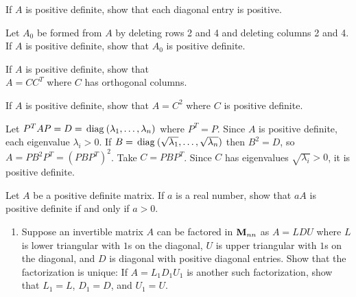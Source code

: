 \begin{multicols}{2}
\begin{ex}
If $A$ is positive definite, show that each diagonal entry is positive.
\end{ex}

\begin{ex}
Let $A_{0}$ be formed from $A$ by deleting rows 2 and 4 and deleting columns 2 and 4. If $A$ is positive definite, show that $A_{0}$ is positive definite.
\end{ex}

\begin{ex}
If $A$ is positive definite, show that \\ $A = CC^{T}$ where $C$ has orthogonal columns.
\end{ex}

\begin{ex}
If $A$ is positive definite, show that $A = C^{2}$ where $C$ is positive definite.

\begin{sol}
Let $P^{T}AP = D = \thinspace\operatorname{diag\medspace}(\lambda_{1}, \dots, \lambda_{n})$ where $P^{T} = P$. Since $A$ is positive definite, each eigenvalue $\lambda_{i} > 0$. If $B = \thinspace\operatorname{diag\medspace}(\sqrt{\lambda_{1}}, \dots, \sqrt{\lambda_{n}})$ then $B^{2} = D$, so $A = PB^{2}P^{T} = (PBP^{T})^{2}$. Take $C = PBP^{T}$. Since $C$ has eigenvalues $\sqrt{\lambda_{i}} > 0$, it is positive definite.
\end{sol}
\end{ex}

\begin{ex}
Let $A$ be a positive definite matrix. If $a$ is a real number, show that $aA$ is positive definite if and only if $a > 0$.
\end{ex}

\begin{ex}
\begin{enumerate}[label={\alph*.}]
\item Suppose an invertible matrix $A$ can be factored in $\textbf{M}_{nn}$ as $A = LDU$ where $L$ is lower triangular with $1$s on the diagonal, $U$ is upper triangular with $1$s on the diagonal, and $D$ is diagonal with positive diagonal entries. Show that the factorization is unique: If $A = L_{1}D_{1}U_{1}$ is another such factorization, show that $L_{1} = L$, $D_{1} = D$, and $U_{1} = U$.


\end{enumerate}
\end{ex}
\end{multicols}

